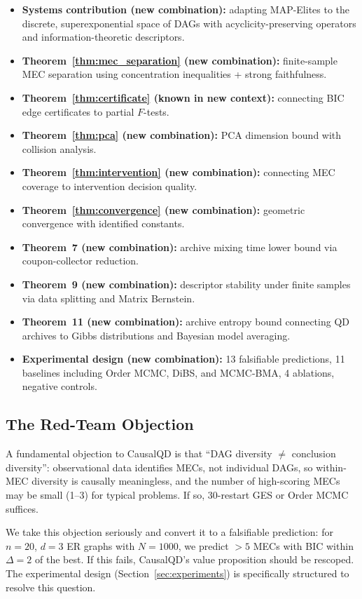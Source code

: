 \documentclass{article}
\theoremstyle{definition}
\theoremstyle{plain}
\theoremstyle{remark}
\begin{document}
\begin{itemize}
  \item \textbf{Systems contribution (new combination):} adapting MAP-Elites to
    the discrete, superexponential space of DAGs with acyclicity-preserving
    operators and information-theoretic descriptors.
  \item \textbf{Theorem~\ref{thm:mec_separation} (new combination):}
    finite-sample MEC separation using concentration inequalities + strong
    faithfulness.
  \item \textbf{Theorem~\ref{thm:certificate} (known in new context):}
    connecting BIC edge certificates to partial $F$-tests.
  \item \textbf{Theorem~\ref{thm:pca} (new combination):} PCA dimension bound
    with collision analysis.
  \item \textbf{Theorem~\ref{thm:intervention} (new combination):} connecting MEC
    coverage to intervention decision quality.
  \item \textbf{Theorem~\ref{thm:convergence} (new combination):} geometric
    convergence with identified constants.
  \item \textbf{Theorem~7 (new combination):} archive mixing time lower bound
    via coupon-collector reduction.
  \item \textbf{Theorem~9 (new combination):} descriptor stability under finite
    samples via data splitting and Matrix Bernstein.
  \item \textbf{Theorem~11 (new combination):} archive entropy bound connecting
    QD archives to Gibbs distributions and Bayesian model averaging.
  \item \textbf{Experimental design (new combination):} 13 falsifiable predictions,
    11 baselines including Order MCMC, DiBS, and MCMC-BMA, 4 ablations, negative controls.
\end{itemize}

\subsection{The Red-Team Objection}

A fundamental objection to CausalQD is that ``DAG diversity $\neq$ conclusion
diversity'': observational data identifies MECs, not individual DAGs, so
within-MEC diversity is causally meaningless, and the number of high-scoring MECs
may be small (1--3) for typical problems. If so, 30-restart GES or Order MCMC
suffices.

We take this objection seriously and convert it to a falsifiable prediction: for
$n = 20$, $d = 3$ ER graphs with $N = 1000$, we predict $> 5$ MECs with BIC
within $\Delta = 2$ of the best. If this fails, CausalQD's value proposition
should be rescoped. The experimental design (Section~\ref{sec:experiments}) is
specifically structured to resolve this question.
\end{document}
